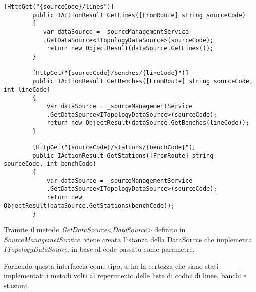 \begin{lstlisting}[caption={TopologyController.cs}, style=javaScriptCode]
        [HttpGet("{sourceCode}/lines")]
        public IActionResult GetLines([FromRoute] string sourceCode)
        {
           var dataSource = _sourceManagementService
           .GetDataSource<ITopologyDataSource>(sourceCode);
            return new ObjectResult(dataSource.GetLines());
        }

        [HttpGet("{sourceCode}/benches/{lineCode}")]
        public IActionResult GetBenches([FromRoute] string sourceCode, int lineCode)
        {
            var dataSource = _sourceManagementService
            .GetDataSource<ITopologyDataSource>(sourceCode);
            return new ObjectResult(dataSource.GetBenches(lineCode));
        }

        [HttpGet("{sourceCode}/stations/{benchCode}")]
        public IActionResult GetStations([FromRoute] string sourceCode, int benchCode)
        {
            var dataSource = _sourceManagementService
            .GetDataSource<ITopologyDataSource>(sourceCode);
            return new ObjectResult(dataSource.GetStations(benchCode));
        }
\end{lstlisting}
Tramite il metodo \textit{GetDataSource<DataSource>} definito in \textit{SourceManagemetService}, viene creata l'istanza della DataSource che implementa \textit{ITopologyDataSource}, in base al code passato come parametro.

Fornendo questa interfaccia come tipo, si ha la certezza che siano stati implementati i metodi volti al reperimento delle liste di codici di linee, banchi e stazioni.